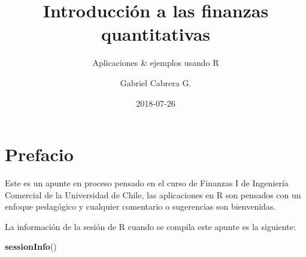 \documentclass[12pt,]{book}
\title{Introducción a las finanzas quantitativas}
\subtitle{Aplicaciones \& ejemplos usando R}
\author{Gabriel Cabrera G.}
\date{2018-07-26}
\newenvironment{Shaded}{\begin{snugshade}}{\end{snugshade}}
\newcommand{\KeywordTok}[1]{\textcolor[rgb]{0.13,0.29,0.53}{\textbf{#1}}}
\newcommand{\NormalTok}[1]{#1}
\begin{document}
\maketitle

{
\hypersetup{linkcolor=black}
\setcounter{tocdepth}{2}
\tableofcontents
}
\listoftables
\listoffigures
\chapter*{Prefacio}\label{prefacio}


Este es un apunte en proceso pensado en el curso de Finanzas I de
Ingeniería Comercial de la Universidad de Chile, las aplicaciones en R
son pensados con un enfoque pedagógico y cualquier comentario o
sugerencias son bienvenidas.

La información de la sesión de R cuando se compila este apunte es la
siguiente:

\begin{Shaded}
\begin{Highlighting}[]
\KeywordTok{sessionInfo}\NormalTok{()}
\end{Highlighting}
\end{Shaded}
\end{document}
